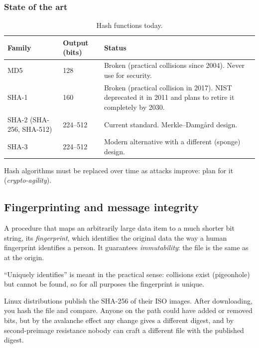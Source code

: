 \subsubsection{State of the art}

\begin{table}[H]
\centering
\caption{Hash functions today.}
\label{tab:hash-state}
\begin{tabularx}{\textwidth}{@{}l l X@{}}
\toprule
Family & Output (bits) & Status \\
\midrule
MD5 & 128 & Broken (practical collisions since 2004). Never use for security. \\
SHA-1 & 160 & Broken (practical collision in 2017). NIST deprecated it in 2011 and plans to retire it completely by 2030. \\
SHA-2 (SHA-256, SHA-512) & 224--512 & Current standard. Merkle--Damgård design. \\
SHA-3 & 224--512 & Modern alternative with a different (sponge) design. \\
\bottomrule
\end{tabularx}
\end{table}

Hash algorithms must be replaced over time as attacks improve: plan for it (\emph{crypto-agility}).

\subsection{Fingerprinting and message integrity}

\begin{definition}[Fingerprinting]
A procedure that maps an arbitrarily large data item to a much shorter bit string, its \emph{fingerprint}, which identifies the original data the way a human fingerprint identifies a person. It guarantees \emph{immutability}: the file is the same as at the origin.
\end{definition}

\begin{remark}
\enquote{Uniquely identifies} is meant in the practical sense: collisions exist (pigeonhole) but cannot be found, so for all purposes the fingerprint is unique.
\end{remark}

\begin{example}
Linux distributions publish the SHA-256 of their ISO images. After downloading, you hash the file and compare. Anyone on the path could have added or removed bits, but by the avalanche effect any change gives a different digest, and by second-preimage resistance nobody can craft a different file with the published digest.
\end{example}

